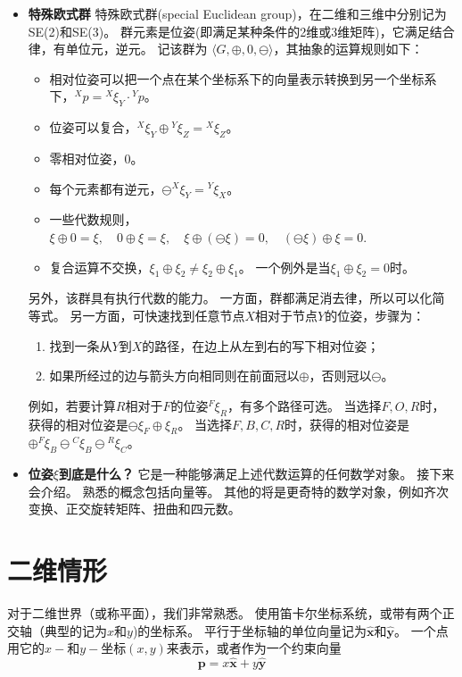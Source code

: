 \documentclass[UTF8,a4paper,10pt]{ctexart}
\begin{document}
\begin{itemize}
\item{\textbf{特殊欧式群}}
  特殊欧式群(special Euclidean group)，在二维和三维中分别记为SE(2)和SE(3)。
  群元素是位姿(即满足某种条件的2维或3维矩阵)，它满足结合律，有单位元，逆元。
  记该群为 $\langle G,\oplus,0,\ominus\rangle$，其抽象的运算规则如下：
  \begin{itemize}
  \item {相对位姿可以把一个点在某个坐标系下的向量表示转换到另一个坐标系下}，${}^Xp={}^X\xi_Y\cdot{}^Yp$。
  \item{位姿可以复合}，${}^X\xi_Y\oplus{}^Y\xi_Z={}^X\xi_Z$。
  \item{零相对位姿，$0$}。
  \item{每个元素都有逆元}，$\ominus{}^X\xi_Y={}^Y\xi_X$。
  \item{一些代数规则}，
    $
    \xi\oplus0=\xi,\quad0\oplus\xi=\xi,\quad\xi\oplus(\ominus\xi)=0,\quad(\ominus\xi)\oplus\xi=0.
    $
  \item {复合运算不交换}，$\xi_1\oplus\xi_2\ne\xi_2\oplus\xi_1$。
    一个例外是当$\xi_1\oplus\xi_2=0$时。
  \end{itemize}
  另外，该群具有执行代数的能力。
  一方面，群都满足消去律，所以可以化简等式。
  另一方面，可快速找到任意节点$X$相对于节点$Y$的位姿，步骤为：
  \begin{enumerate}
  \item 找到一条从$Y$到$X$的路径，在边上从左到右的写下相对位姿；
  \item 如果所经过的边与箭头方向相同则在前面冠以$\oplus$，否则冠以$\ominus$。
  \end{enumerate}
  例如，若要计算$R$相对于$F$的位姿${}^F\xi_R$，有多个路径可选。
  当选择$F,O,R$时，获得的相对位姿是$\ominus\xi_F\oplus\xi_R$。
  当选择$F,B,C,R$时，获得的相对位姿是$\oplus{}^F\xi_B\ominus{}^C\xi_B\ominus{}^R\xi_C$。
\item{\textbf{位姿$\xi$到底是什么？}}
  它是一种能够满足上述代数运算的任何数学对象。
  接下来会介绍。
  熟悉的概念包括向量等。
  其他的将是更奇特的数学对象，例如齐次变换、正交旋转矩阵、扭曲和四元数。
\end{itemize}

\section{二维情形}\label{sec:2D}

对于二维世界（或称平面），我们非常熟悉。
使用笛卡尔坐标系统，或带有两个正交轴（典型的记为$x$和$y$)的坐标系。
平行于坐标轴的单位向量记为$\hat{\mathbf{x}}$和$\hat{\mathbf{y}}$。
一个点用它的$x-$和$y-$坐标$(x,y)$来表示，或者作为一个约束向量
\begin{equation}\label{eq:point2D}
  \mathbf{p}=x\hat{\mathbf{x}}+y\hat{\mathbf{y}}
\end{equation}
\end{document}
